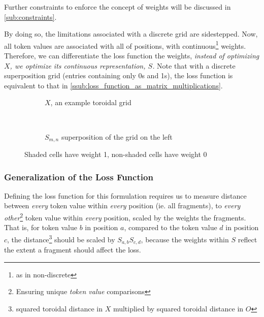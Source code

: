 Further constraints to enforce the concept of weights will be discussed in \ref{sub:constraints}.

By doing so, the limitations associated with a discrete grid are sidestepped. Now, all token values are associated with all of positions, with continuous\footnote{as in non-discrete} weights. Therefore, we can differentiate the loss function \wrt{} the weights, \emph{instead of optimizing $X$, we optimize its continuous representation, $S$.} Note that with a discrete superposition grid (entries containing only 0s and 1s), the loss function is equivalent to that in \ref{ssub:loss_function_as_matrix_multiplications}.

\begin{figure}[htpb]
    \centering
    \begin{subfigure}[t]{0.5\textwidth}
    \begin{center}
    \end{center}
    \caption{$X$, an example toroidal grid}
    \end{subfigure}%
    ~
    \begin{subfigure}[t]{0.5\textwidth}
    \begin{center}
    \end{center}
    \caption{$S_{m,n}$ superposition of the grid on the left}
    \label{fig:superpositionShade}
    \end{subfigure}

    \caption{Shaded cells have weight 1, non-shaded cells have weight 0}
    \label{fig:superpositionExample}
\end{figure}

\subsubsection{Generalization of the Loss Function}%
\label{ssub:generalization_of_the_loss_function}

Defining the loss function for this formulation requires us to measure distance between \emph{every} token value within \emph{every} position (ie. all fragments), to \emph{every other}\footnote{Ensuring unique \emph{token value} comparisons} token value within \emph{every} position, scaled by the weights the fragments. That is, for token value $b$ in position $a$, compared to the token value $d$ in position $c$, the distance\footnote{squared toroidal distance in $X$ multiplied by squared toroidal distance in $O$} should be scaled by $S_{a,b}S_{c,d}$, because the weights within $S$ reflect the extent a fragment should affect the loss.

